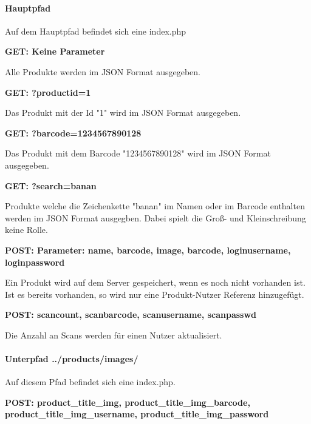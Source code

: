 \documentclass{scrartcl}
\begin{document}
\paragraph{Hauptpfad}

Auf dem Hauptpfad befindet sich eine index.php \newline 

\noindent\textbf{GET: Keine Parameter}
 
\noindent Alle Produkte werden im JSON Format ausgegeben. \newline 

\noindent\textbf{GET: ?productid=1}

\noindent Das Produkt mit der Id "1" wird im JSON Format ausgegeben. \newline 

\noindent\textbf{GET: ?barcode=1234567890128}

\noindent Das Produkt mit dem Barcode "1234567890128" wird im JSON Format ausgegeben. \newline 

\noindent \textbf{GET: ?search=banan}

\noindent Produkte welche die Zeichenkette "banan" im Namen oder im Barcode enthalten werden im JSON Format ausgegben. Dabei spielt die Groß- und Kleinschreibung keine Rolle. \newline

\noindent \textbf{POST: Parameter: name, barcode, image, barcode, loginusername, loginpassword}

\noindent Ein Produkt wird auf dem Server gespeichert, wenn es noch nicht vorhanden ist. Ist es bereits vorhanden, so wird nur eine Produkt-Nutzer Referenz hinzugefügt. \newline

\noindent \textbf{POST: scancount, scanbarcode, scanusername, scanpasswd}

\noindent Die Anzahl an Scans werden für einen Nutzer aktualisiert.

\paragraph{Unterpfad ../products/images/}
Auf diesem Pfad befindet sich eine index.php. \newline 

\noindent \textbf{POST: product\_title\_img, product\_title\_img\_barcode, \newline  product\_title\_img\_username, product\_title\_img\_password}
\end{document}
